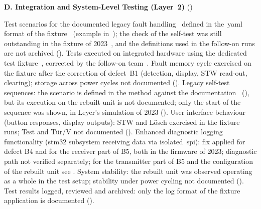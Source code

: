 \medskip
\noindent\textbf{D. Integration and System-Level Testing (Layer~2)} ()
\begin{checklist}
	 Test scenarios for the documented legacy fault handling~\cite{rexroth1992wsp} defined in the~\gls{yaml} format of the fixture~\cite{dolata2023} (example in~); the check of the self-test was still outstanding in the fixture of 2023~\cite[Sec.~6.2]{dolata2023}, and the definitions used in the follow-on runs are not archived ().
	 Tests executed on integrated hardware using the dedicated test fixture~\cite{dolata2023}, corrected by the follow-on team~\cite[pp.~10--15]{savchuk2025}.
	 Fault memory cycle exercised on the fixture after the correction of defect~B1 (detection, display, STW read-out, clearing); storage across power cycles not documented ().
	 Legacy self-test sequences: the scenario is defined in the method against the documentation~\cite{rexroth1992wsp} (), but its execution on the rebuilt unit is not documented; only the start of the sequence was shown, in Leyer's simulation of 2023 ().
	 User interface behaviour (button responses, display outputs): STW and Lösch exercised in the fixture runs; Test and Tür/V not documented ().
	 Enhanced diagnostic logging functionality (\gls{stm32} subsystem receiving data via isolated~\gls{spi}): fix applied for defect B4 and for the receiver part of B5, both in the firmware of 2023; diagnostic path not verified separately; for the transmitter part of B5 and the configuration of the rebuilt unit see .
	 System stability: the rebuilt unit was observed operating as a whole in the test setup; stability under power cycling not documented ().
	 Test results logged, reviewed and archived: only the log format of the fixture application is documented ().
\end{checklist}

